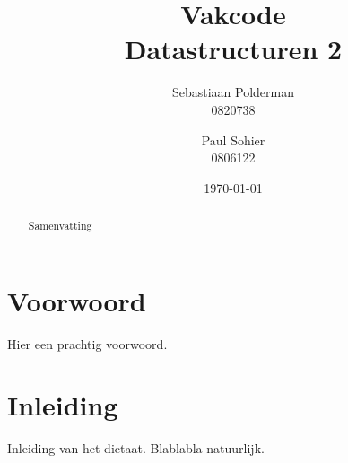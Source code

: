 \documentclass[a4paper,11pt]{report}
\begin{document}
\title{
  Vakcode\\
  Datastructuren 2
}
\author{
  Sebastiaan Polderman\\
  0820738\\
  \and
  Paul Sohier\\
  0806122
}
\date{\today}
\maketitle
\begin{abstract}\centering
Samenvatting
\end{abstract}

\chapter{Voorwoord}
Hier een prachtig voorwoord. 

\tableofcontents

\chapter{Inleiding}
Inleiding van het dictaat. Blablabla natuurlijk. 





\appendix


\printindex

\end{document}

